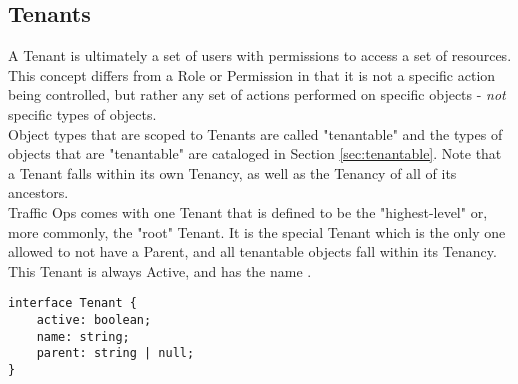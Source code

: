 %
%

\subsection{Tenants}
A Tenant is ultimately a set of users with permissions to access a set of
resources. This concept differs from a Role or Permission in that it is not
a specific action being controlled, but rather any set of actions performed on
specific objects - \emph{not} specific types of objects.\\
Object types that are scoped to Tenants are called "tenantable" and the types
of objects that are "tenantable" are cataloged in Section
\ref{sec:tenantable}. Note that a Tenant falls within its own Tenancy, as well
as the Tenancy of all of its ancestors.\\
Traffic Ops comes with one Tenant that is defined to be the "highest-level" or,
more commonly, the "root" Tenant. It is the special Tenant which is the only
one allowed to not have a Parent, and all tenantable objects fall within its
Tenancy. This Tenant is always Active, and has the name .

\begin{codelisting}
\begin{verbatim}
interface Tenant {
	active: boolean;
	name: string;
	parent: string | null;
}
\end{verbatim}
\end{codelisting}

